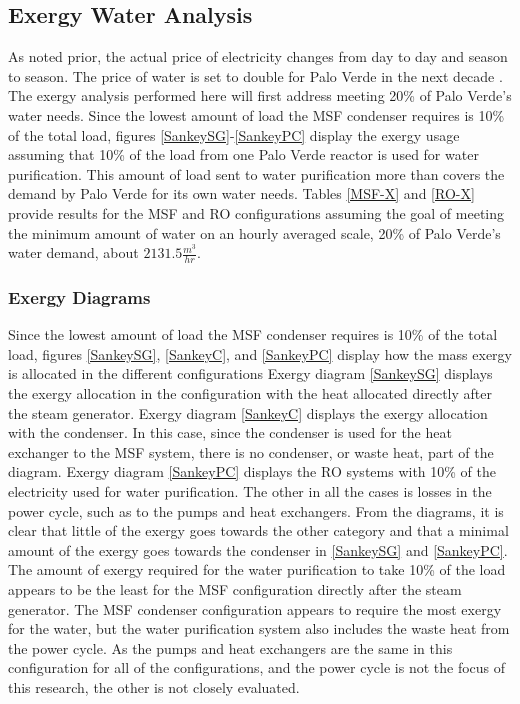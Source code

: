 \clearpage

\subsection{Exergy Water Analysis}
As noted prior, the actual price of electricity changes from day to day and season to season.  The price of water is set to double for Palo Verde in the next decade \cite{Brown2018}. The exergy analysis performed here will first address meeting 20\% of Palo Verde's water needs. Since the lowest amount of load the MSF condenser requires is 10\% of the total load, figures \ref{SankeySG}-\ref{SankeyPC} display the exergy usage assuming that 10\% of the load from one Palo Verde reactor is used for water purification. This amount of load sent to water purification more than covers the demand by Palo Verde for its own water needs. Tables \ref{MSF-X} and \ref{RO-X} provide results for the MSF and RO configurations assuming the goal of meeting the minimum amount of water on an hourly averaged scale, 20\% of Palo Verde's water demand, about $2131.5 \frac{m^3}{hr}$.

\subsubsection{Exergy Diagrams}

Since the lowest amount of load the MSF condenser requires is 10\% of the total load, figures \ref{SankeySG}, \ref{SankeyC}, and \ref{SankeyPC} display how the mass exergy is allocated in the different configurations  Exergy diagram \ref{SankeySG} displays the exergy allocation in the configuration with the heat allocated directly after the steam generator. Exergy diagram \ref{SankeyC} displays the exergy allocation with the condenser.  In this case, since the condenser is used for the heat exchanger to the MSF system, there is no condenser, or waste heat, part of the diagram. Exergy diagram \ref{SankeyPC} displays the RO systems with 10\% of the electricity used for water purification. The other in all the cases is losses in the power cycle, such as to the pumps and heat exchangers. From the diagrams, it is clear that little of the exergy goes towards the other category and that a minimal amount of the exergy goes towards the condenser in \ref{SankeySG} and \ref{SankeyPC}.  The amount of exergy required for the water purification to take 10\% of the load appears to be the least for the MSF configuration directly after the steam generator. The MSF condenser configuration appears to require the most exergy for the water, but the water purification system also includes the waste heat from the power cycle. As the pumps and heat exchangers are the same in this configuration for all of the configurations, and the power cycle is not the focus of this research, the other is not closely evaluated.

